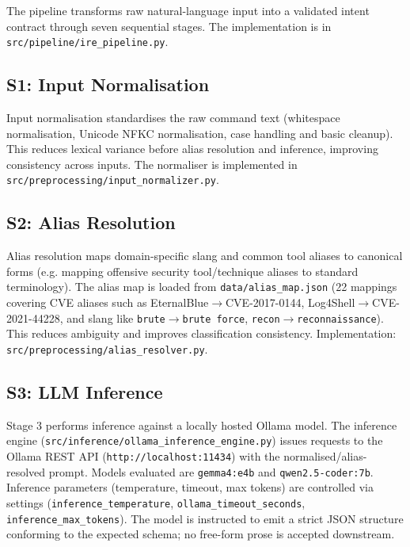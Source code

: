 The pipeline transforms raw natural-language input into a validated intent contract through seven sequential stages. The implementation is in \texttt{src/pipeline/ire\_pipeline.py}.

\subsection{S1: Input Normalisation}

Input normalisation standardises the raw command text (whitespace normalisation, Unicode NFKC normalisation, case handling and basic cleanup). This reduces lexical variance before alias resolution and inference, improving consistency across inputs. The normaliser is implemented in \texttt{src/preprocessing/input\_normalizer.py}.

\subsection{S2: Alias Resolution}

Alias resolution maps domain-specific slang and common tool aliases to canonical forms (e.g. mapping offensive security tool/technique aliases to standard terminology). The alias map is loaded from \texttt{data/alias\_map.json} (22 mappings covering CVE aliases such as EternalBlue$\rightarrow$CVE-2017-0144, Log4Shell$\rightarrow$CVE-2021-44228, and slang like \texttt{brute}$\rightarrow$\texttt{brute force}, \texttt{recon}$\rightarrow$\texttt{reconnaissance}). This reduces ambiguity and improves classification consistency. Implementation: \texttt{src/preprocessing/alias\_resolver.py}.

\subsection{S3: LLM Inference}

Stage 3 performs inference against a locally hosted Ollama model. The inference engine (\texttt{src/inference/ollama\_inference\_engine.py}) issues requests to the Ollama REST API (\texttt{http://localhost:11434}) with the normalised/alias-resolved prompt. Models evaluated are \texttt{gemma4:e4b} and \texttt{qwen2.5-coder:7b}. Inference parameters (temperature, timeout, max tokens) are controlled via settings (\texttt{inference\_temperature}, \texttt{ollama\_timeout\_seconds}, \texttt{inference\_max\_tokens}). The model is instructed to emit a strict JSON structure conforming to the expected schema; no free-form prose is accepted downstream.

